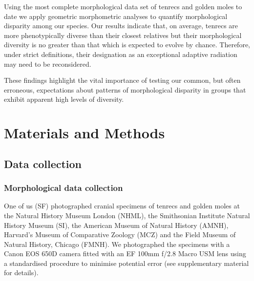\documentclass[12pt,a4paper]{article}
\begin{document}
Using the most complete morphological data set of tenrecs and golden moles to date  we apply geometric morphometric analyses \citep{Rohlf1993, Zelditch2012} to quantify morphological disparity among our species. Our results indicate that, on average, tenrecs are more phenotypically diverse than their closest relatives but their morphological diversity is no greater than that which is expected to evolve by chance. Therefore, under strict definitions, their designation as an exceptional adaptive radiation may need to be reconsidered. 

These findings highlight the vital importance of testing our common, but often erroneous, expectations about patterns of morphological disparity in groups that exhibit apparent high levels of diversity. 

\section{Materials and Methods}

\subsection{Data collection} %

\subsubsection{Morphological data collection} %

	
One of us (SF) photographed cranial specimens of tenrecs and golden moles at the Natural History Museum London (NHML), the Smithsonian Institute Natural History Museum (SI), the American Museum of Natural History (AMNH), Harvard's Museum of Comparative Zoology (MCZ) and the Field Museum of Natural History, Chicago (FMNH). We photographed the specimens with a Canon EOS 650D camera fitted with an EF 100mm f/2.8 Macro USM lens using a standardised procedure to minimise potential error (see supplementary material for details). 
\end{document}
